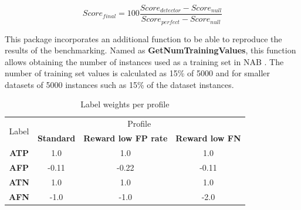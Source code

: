\documentclass[a4paper]{article}\usepackage[]{graphicx}\usepackage[]{color}
\begin{document}
\begin{equation}\label{eq:eq1}
Score_{final} = 100 \frac{Score_{detector} - Score_{null}}{Score_{perfect} - Score_{null}}
\end{equation}

This package incorporates an additional function to be able to reproduce the results of the benchmarking. Named as \textbf{GetNumTrainingValues}, this function allows obtaining the number of instances used as a training set in NAB \cite{7424283}. The number of training set values is calculated as 15\% of 5000 and for smaller datasets of 5000 instances such as 15\% of the dataset instances.


\begin{table}[]
\caption{Label weights per profile}
\label{tab:profile}
\centering
\begin{tabular}{cccc}
\hline
\multirow{2}{*}{Label} & \multicolumn{3}{c}{Profile} \\ \cline{2-4}
 & \textbf{Standard} & \textbf{Reward low FP rate} & \textbf{Reward low FN} \\ \hline
\textbf{ATP} & 1.0 & 1.0 & 1.0 \\ \hline
\textbf{AFP} & -0.11 & -0.22 & -0.11 \\ \hline
\textbf{ATN} & 1.0 & 1.0 & 1.0 \\ \hline
\textbf{AFN} & -1.0 & -1.0 & -2.0 \\ \hline
\end{tabular}
\end{table}
\end{document}
